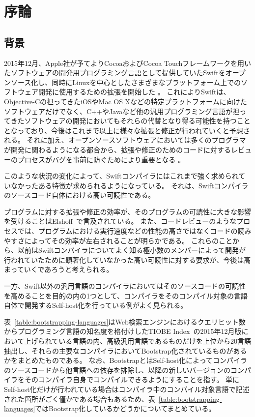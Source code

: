 \chapter{序論}
\label{introduction}

\section{背景}
\label{introduction:background}

2015年12月、Apple社が予てよりCocoaおよびCocoa Touchフレームワークを用いたソフトウェアの開発用プログラミング言語として提供していたSwiftをオープンソース化し、同時にLinuxを中心としたさまざまなプラットフォーム上でのソフトウェア開発に使用するための拡張を開始した
。
これによりSwiftは、Objective-Cの担ってきたiOSやMac OS Xなどの特定プラットフォームに向けたソフトウェアだけでなく、C++やJavaなど他の汎用プログラミング言語が担ってきたソフトウェアの開発においてもそれらの代替となり得る可能性を持つこととなっており、今後はこれまで以上に様々な拡張と修正が行われていくと予想される。
それに加え、オープンソースソフトウェアにおいては多くのプログラマが開発に関わるようになる都合から、拡張や修正のためのコードに対するレビューのプロセスがバグを事前に防ぐためにより重要となる
。

このような状況の変化によって、Swiftコンパイラにはこれまで強く求められていなかったある特徴が求められるようになっている。
それは、Swiftコンパイラのソースコード自体における高い可読性である。

プログラムに対する拡張や修正の効率が、そのプログラムの可読性に大きな影響を受けることはElshoff~\cite{elshoff}で言及されている。
また、コードレビューのようなプロセスでは、プログラムにおける実行速度などの性能の高さではなくコードの読みやすさによってその効率が左右されることが明らかである。
これらのことから、以前はSwiftコンパイラについてよく知る極小数のメンバーによって開発が行われていたために顕著化していなかった高い可読性に対する要求が、今後は高まっていくであろうと考えられる。

一方、Swift以外の汎用言語のコンパイラにおいてはそのソースコードの可読性を高めることを目的の内の1つとして、コンパイラをそのコンパイル対象の言語自体で開発するSelf-host化を行っている例がよく見られる。

表~\ref{table:bootstrapping-languages}はWeb検索エンジンにおけるクエリヒット数からプログラミング言語の知名度を格付けしたTIOBE Index~\cite{tiobe}の2015年12月版において上げられている言語の内、高級汎用言語であるものだけを上位から20言語抽出し、それらの主要なコンパイラにおいてBootstrap化されているものがあるかをまとめたものである。
なお、BootstrapとはSelf-host化によってコンパイラのソースコードから他言語への依存を排除し、以降の新しいバージョンのコンパイラをそのコンパイラ自身でコンパイルできるようにすることを指す。
単にSelf-host化だけが行われている場合はコンパイラ中のコンパイル対象言語で記述された箇所がごく僅かである場合もあるため、表~\ref{table:bootstrapping-languages}ではBootstrap化しているかどうかについてまとめている。

